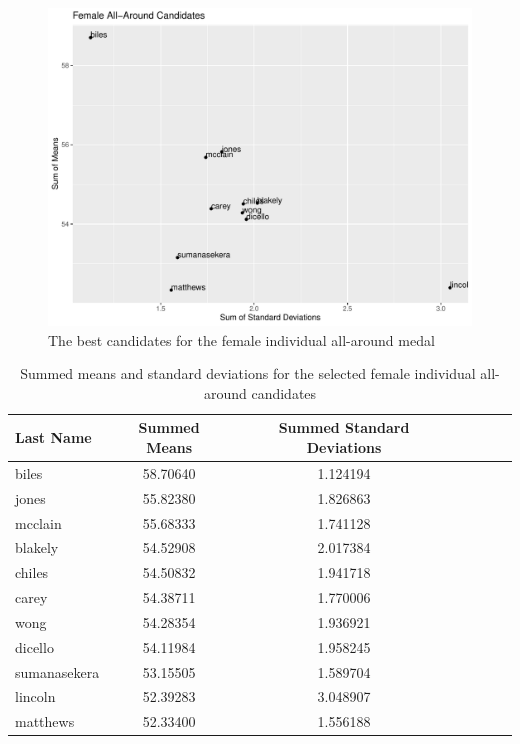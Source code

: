 \documentclass[12pt]{article}
\begin{document}
\begin{figure}
  \centering
  \includegraphics[scale=0.6]{FemaleAthletesAACandidates.pdf}
  \caption{The best candidates for the female individual all-around medal}
  \label{fig:IAA}
\end{figure}

\begin{table}
  \caption{Summed means and standard deviations for the selected female individual all-around candidates}
  \label{tab:tableIAA}
\centering
\begin{tabular}[t]{lccllll}
 \toprule
Last Name & Summed Means & Summed Standard Deviations\\
\midrule
biles & 58.70640 & 1.124194\\
\midrule
jones & 55.82380 & 1.826863\\
\midrule
mcclain & 55.68333 & 1.741128\\
\midrule
blakely & 54.52908 & 2.017384\\
\midrule
chiles & 54.50832 & 1.941718\\
\midrule
carey & 54.38711 & 1.770006\\
\midrule
wong & 54.28354 & 1.936921\\
\midrule
dicello & 54.11984 & 1.958245\\
\midrule
sumanasekera & 53.15505 & 1.589704\\
\midrule
lincoln & 52.39283 & 3.048907\\
\midrule
matthews & 52.33400 & 1.556188\\
\bottomrule
\end{tabular}
\end{table}
\end{document}
